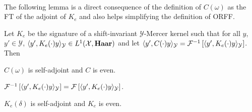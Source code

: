 \paragraph{}
The following lemma is a direct consequence of the definition of $C(\omega)$ as the \acl{FT} of the adjoint of $K_e$ and also helps simplifying the definition of \acs{ORFF}.
\begin{lemma}
\label{lm:C_characterization}
Let $K_e$ be the signature of a shift-invariant $\mathcal{Y}$-Mercer kernel such that for all $y$, $y'\in\mathcal{Y}$, $\langle y', K_e(\cdot)y\rangle_{\mathcal{Y}}\in L^1(\mathcal{X},\mathbf{Haar})$ and let $\langle y', C(\cdot)y\rangle_{\mathcal{Y}}=\mathcal{F}^{-1}\left[\langle y', K_e(\cdot)y\rangle_{\mathcal{Y}}\right]$. Then
\begin{propenum}
\item \label{lm:C_characterization_1} $C(\omega)$ is self-adjoint and $C$ is even.
\item \label{lm:C_characterization_2} $\mathcal{F}^{-1}\left[\langle y', K_e(\cdot)y\rangle_{\mathcal{Y}}\right] = \mathcal{F}\left[\langle y', K_e(\cdot)y\rangle_{\mathcal{Y}}\right]$.
\item \label{lm:C_characterization_3} $K_e(\delta)$ is self-adjoint and $K_e$ is even.
\end{propenum}
\end{lemma}
